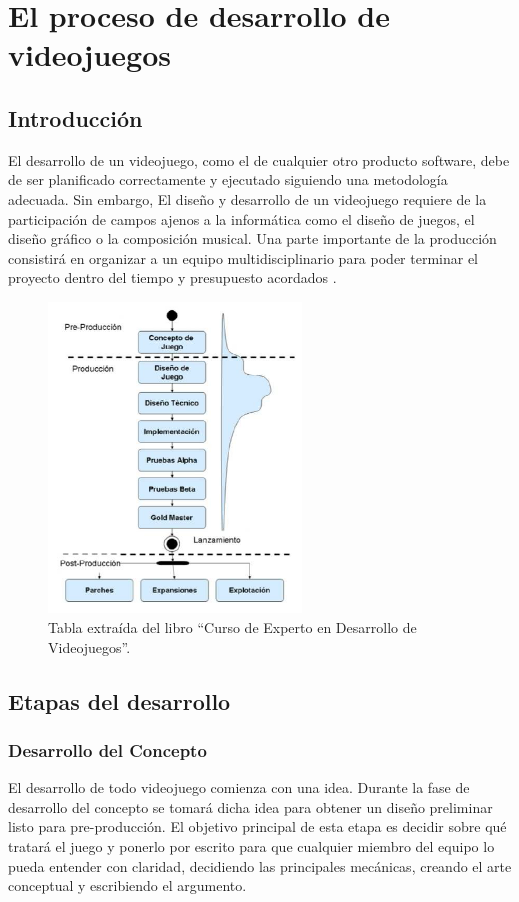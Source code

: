 \section{El proceso de desarrollo de videojuegos}
\subsection{Introducción}
El desarrollo de un videojuego, como el de cualquier otro producto software, debe de ser planificado correctamente y ejecutado siguiendo una metodología adecuada. Sin embargo, El diseño y desarrollo de un videojuego requiere de la participación de campos ajenos a la informática como el diseño de juegos, el diseño gráfico o la composición musical. Una parte importante de la producción consistirá en organizar a un equipo multidisciplinario para poder terminar el proyecto dentro del tiempo y presupuesto acordados \cite{libro_esi}.

\begin{figure}[h]
    \centering
    \includegraphics[width=0.6\textwidth]{images/estadodelarte/desarrollo/etapas-desarrollo}
    \caption{Tabla extraída del libro ``Curso de Experto en Desarrollo de Videojuegos''.}
\end{figure}

\subsection{Etapas del desarrollo}
\subsubsection{Desarrollo del Concepto}
El desarrollo de todo videojuego comienza con una idea. Durante la fase de desarrollo del concepto se tomará dicha idea para obtener un diseño preliminar listo para pre-producción. El objetivo principal de esta etapa es decidir sobre qué tratará el juego y ponerlo por escrito para que cualquier miembro del equipo lo pueda entender con claridad, decidiendo las principales mecánicas, creando el arte conceptual y escribiendo el argumento\cite{game_design_2}. 

